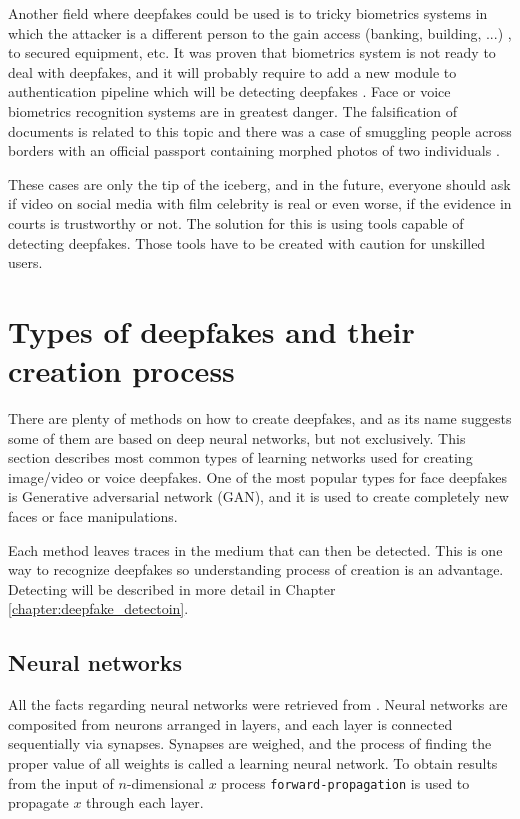 Another field where deepfakes could be used is to tricky biometrics systems in which the attacker is a different person to the gain access (banking, building, ...) \cite{DawnOfTextDependentSociety}, to secured equipment, etc. It was proven that biometrics system is not ready to deal with deepfakes, and it will probably require to add a new module to authentication pipeline which will be detecting deepfakes \cite{DigitalFaceManipulation}. Face or voice biometrics recognition systems are in greatest danger. The falsification of documents is related to this topic and there was a case of smuggling people across borders with an official passport containing morphed photos of two individuals \cite{FaceMorphingAttackDetectionMethods}.

These cases are only the tip of the iceberg, and in the future, everyone should ask if video on social media with film celebrity is real or even worse, if the evidence in courts is trustworthy or not. The solution for this is using tools capable of detecting deepfakes. Those tools have to be created with caution for unskilled users.

\section{Types of deepfakes and their creation process}
\label{section:deepfakes_creation}

There are plenty of methods on how to create deepfakes, and as its name suggests some of them are based on deep neural networks, but not exclusively.  This section describes most common types of learning networks used for creating image/video or voice deepfakes. One of the most popular types for face deepfakes is Generative adversarial network (GAN), and it is used to create completely new faces or face manipulations.

Each method leaves traces in the medium that can then be detected. This is one way to recognize deepfakes so understanding process of creation is an advantage. Detecting will be described in more detail in Chapter \ref{chapter:deepfake_detectoin}.

\subsection{Neural networks}

All the facts regarding neural networks were retrieved from \cite{CreationandDetectionofDeepfakes}. Neural networks are composited from neurons arranged in layers, and each layer is connected sequentially via synapses. Synapses are weighed, and the process of finding the proper value of all weights is called a learning neural network. To obtain results from the input of \(n\)-dimensional \(x\) process \texttt{forward-propagation} is used to propagate \(x\) through each layer.

